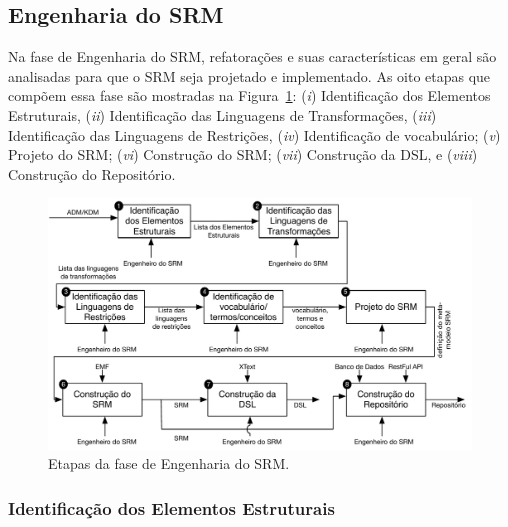 \subsection{Engenharia do SRM}\label{Engenharia_do_Meta_modelo_SRM}

Na fase de Engenharia do SRM, refatorações e suas características em geral são analisadas para que o SRM seja projetado e implementado. As oito etapas que compõem essa fase são mostradas na Figura~\ref{fig:etapas_da_fase_de_e_do_SRM}: (\textit{i}) Identificação dos Elementos Estruturais, (\textit{ii}) Identificação das Linguagens de Transformações, (\textit{iii}) Identificação das Linguagens de Restrições, (\textit{iv}) Identificação de vocabulário; (\textit{v}) Projeto do SRM; (\textit{vi}) Construção do SRM; (\textit{vii}) Construção da DSL, e (\textit{viii}) Construção do Repositório. 

\begin{figure}[h]
	\centering
	\caption{Etapas da fase de Engenharia do SRM.}
	\label{fig:etapas_da_fase_de_e_do_SRM}
	\includegraphics[scale=0.75]{images/todasAsFasesDaEngenhariaDOSRM5}
	\fautor
\end{figure}

\subsubsection{Identificação dos Elementos Estruturais}


